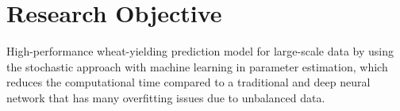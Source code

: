 \section*{Research Objective}
High-performance wheat-yielding prediction model for large-scale data by using the stochastic approach with machine learning in
parameter estimation, which reduces the computational time compared to a traditional and deep neural network that has
many overfitting issues due to unbalanced data.
